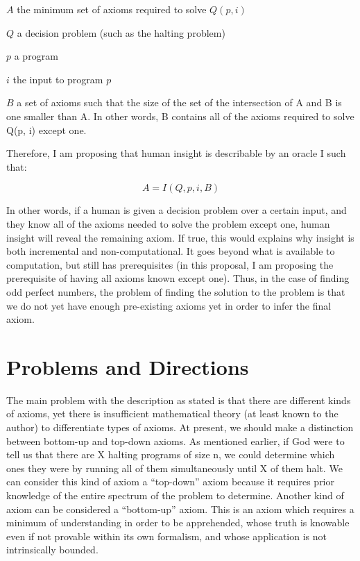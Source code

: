\begin{description}
\item{$A$}
the minimum set of axioms required to solve $Q(p, i)$

\item{$Q$}
a decision problem (such as the halting problem)

\item{$p$}
a program

\item{$i$} 
the input to program $p$

\item{$B$}
a set of axioms such that the size of the set of the intersection of A and B is one smaller than A.  In other words, B contains all of the axioms required to solve Q(p, i) except one.
\end{description}

Therefore, I am proposing that human insight is describable by an oracle I such that:

\begin{equation}
A = I(Q, p, i, B)
\end{equation}

In other words, if a human is given a decision problem over a certain input, and they know all of the axioms needed to solve the problem except one, human insight will reveal the remaining axiom.  If true, this would explains why insight is both incremental and non-computational.  It goes beyond what is available to computation, but still has prerequisites (in this proposal, I am proposing the prerequisite of having all axioms known except one).  Thus, in the case of finding odd perfect numbers, the problem of finding the solution to the problem is that we do not yet have enough pre-existing axioms yet in order to infer the final axiom.

\section{Problems and Directions}

The main problem with the description as stated is that there are different kinds of axioms, yet there is insufficient mathematical theory (at least known to the author) to differentiate types of axioms.  At present, we should make a distinction between bottom-up and top-down axioms.  As mentioned earlier, if God were to tell us that there are X halting programs of size n, we could determine which ones they were by running all of them simultaneously until X of them halt.  We can consider this kind of axiom a ``top-down'' axiom because it requires prior knowledge of the entire spectrum of the problem to determine.  Another kind of axiom can be considered a ``bottom-up'' axiom.  This is an axiom which requires a minimum of understanding in order to be apprehended, whose truth is knowable even if not provable within its own formalism, and whose application is not intrinsically bounded.  

